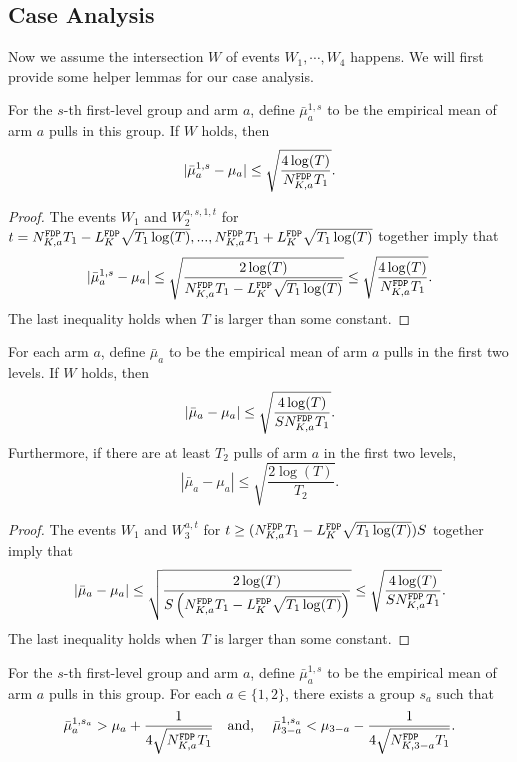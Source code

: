 \subsection{Case Analysis}
Now we assume the intersection $W$ of events $W_1,\cdots,W_4$ happens. We will
first provide some helper lemmas for our case analysis.

\begin{lemma}
  For the $s$-th first-level group and arm $a$, define
  $\bar{\mu}_a^{1,s}$ to be the empirical mean of arm $a$ pulls in
  this group. If $W$ holds, then
  \[
    |\bar{\mu}_a^{1,s} - \mu_a| \leq \sqrt{\frac{4\log(T)}{\fdpN T_1}}.
  \]
\end{lemma}

\begin{proof}
  The events $W_1$ and $W_2^{a,s,1,t}$ for
  $t = \fdpN T_1- \GdT \sqrt{T_1\log(T)},...,\fdpN T_1 + \GdT
  \sqrt{T_1\log(T)}$ together imply that
\[
|\bar{\mu}_a^{1,s} - \mu_a| \leq \sqrt{\frac{2\log(T)}{\fdpN T_1- \GdT \sqrt{T_1\log(T)}}} \leq \sqrt{\frac{4\log(T)}{\fdpN T_1}}.
\]
The last inequality holds when $T$ is larger than some constant.
\end{proof}


\begin{lemma}
  For each arm $a$, define $\bar{\mu}_a$ to be the empirical mean of
  arm $a$ pulls in the first two levels. If $W$ holds, then
  \[
    |\bar{\mu}_a - \mu_a| \leq \sqrt{\frac{4\log(T)}{S \fdpN T_1}} .
  \]
Furthermore, if there are at least $T_2$ pulls of arm $a$ in the first two levels,
\[
|\bar{\mu}_a-\mu_a| \leq \sqrt{\frac{2\log(T)}{T_2}}.
\]
\end{lemma}

\begin{proof}
The events $W_1$ and $W_3^{a,t}$ for $t \geq  (\fdpN T_1- \GdT \sqrt{T_1\log(T)})S$ together imply that
  \[
    |\bar{\mu}_a - \mu_a| \leq \sqrt{\frac{2\log(T)}{S\left(\fdpN T_1- \GdT \sqrt{T_1\log(T)}\right)}} \leq \sqrt{\frac{4\log(T)}{S \fdpN T_1}} .
\]
The last inequality holds when $T$ is larger than some constant.
\end{proof}


\begin{lemma}\label{lem:luck}
  For the $s$-th first-level group and arm $a$, define
  $\bar{\mu}_a^{1,s}$ to be the empirical mean of arm $a$ pulls in
  this group. For each $a \in \{1,2\}$, there exists a group $s_a$
  such that
\[
\bar{\mu}_a ^{1,s_a} > \mu_a + \frac{1}{4\sqrt{\fdpN T_1}} \quad \mbox{and, } \quad
\bar{\mu}_{3-a} ^{1,s_a} < \mu_{3-a}   - \frac{1}{4\sqrt{\fdpN[3-a] T_1}}.
\]
\end{lemma}




